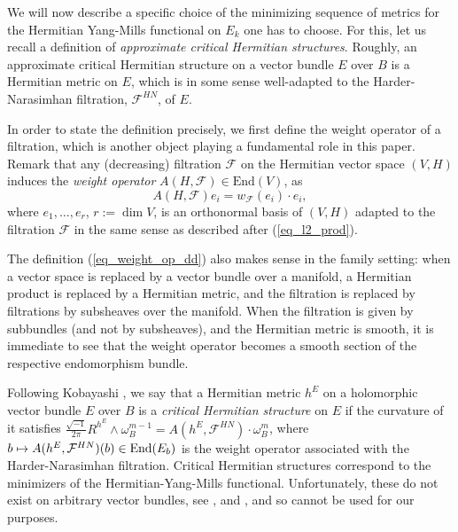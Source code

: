 \documentclass[12pt]{article}
\numberwithin{equation}{section}
\theoremstyle{theorem}
\theoremstyle{definition}
\theoremstyle{remark}
\newcommand{\imun} {\sqrt{-1}}
\begin{document}
	\par 
	We will now describe a specific choice of the minimizing sequence of metrics for the Hermitian Yang-Mills functional on $E_k$ one has to choose.
	For this, let us recall a definition of \textit{approximate critical Hermitian structures}.
	Roughly, an approximate critical Hermitian structure on a vector bundle $E$ over $B$ is a Hermitian metric on $E$, which is in some sense well-adapted to the Harder-Narasimhan filtration, $\mathcal{F}^{HN}$, of $E$. 
	\par 
	In order to state the definition precisely, we first define the weight operator of a filtration, which is another object playing a fundamental role in this paper.
	Remark that any (decreasing) filtration $\mathcal{F}$ on the Hermitian vector space $(V, H)$ induces the \textit{weight operator} $A(H, \mathcal{F}) \in {\textrm{End}}(V)$, as
	\begin{equation}\label{eq_weight_op_dd}
		A(H, \mathcal{F}) e_i = w_{\mathcal{F}}(e_i) \cdot e_i,
	\end{equation}
	where $e_1, \ldots, e_{r}$, $r := \dim V$, is an orthonormal basis of $(V, H)$ adapted to the filtration $\mathcal{F}$ in the same sense as described after (\ref{eq_l2_prod}).
	\par 
	The definition (\ref{eq_weight_op_dd}) also makes sense in the family setting: when a vector space is replaced by a vector bundle over a manifold, a Hermitian product is replaced by a Hermitian metric, and the filtration is replaced by filtrations by subsheaves over the manifold. 
	When the filtration is given by subbundles (and not by subsheaves), and the Hermitian metric is smooth, it is immediate to see that the weight operator becomes a smooth section of the respective endomorphism bundle.
	\par 
	Following Kobayashi \cite{KobaVB}, we say that a Hermitian metric $h^E$ on a holomorphic vector bundle $E$ over $B$ is a \textit{critical Hermitian structure} on $E$ if the curvature of it satisfies $\frac{\imun}{2 \pi}   R^{h^E} \wedge \omega_B^{m - 1} = A(h^E, \mathcal{F}^{HN}) \cdot \omega_B^m$, where $b \mapsto A(h^E, \mathcal{F}^{HN})(b) \in {\rm{End}}(E_b)$ is the weight operator associated with the Harder-Narasimhan filtration.
	Critical Hermitian structures correspond to the minimizers of the Hermitian-Yang-Mills functional. 
	Unfortunately, these do not exist on arbitrary vector bundles, see \cite{UhlYau}, \cite{DonaldASD} and \cite[Theorem 4.3.27]{KobaVB}, and so cannot be used for our purposes.
	\par 
\end{document}
